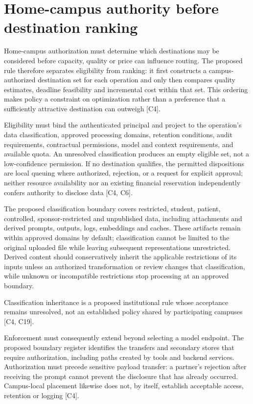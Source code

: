 \documentclass[11pt]{article}
\begin{document}
\section{Home-campus authority before destination ranking}
Home-campus authorization must determine which destinations may be considered before capacity, quality or price can influence routing. The proposed rule therefore separates eligibility from ranking: it first constructs a campus-authorized destination set for each operation and only then compares quality estimates, deadline feasibility and incremental cost within that set. This ordering makes policy a constraint on optimization rather than a preference that a sufficiently attractive destination can outweigh [C4].

Eligibility must bind the authenticated principal and project to the operation\textquoteright{}s data classification, approved processing domains, retention conditions, audit requirements, contractual permissions, model and context requirements, and available quota. An unresolved classification produces an empty eligible set, not a low-confidence permission. If no destination qualifies, the permitted dispositions are local queuing where authorized, rejection, or a request for explicit approval; neither resource availability nor an existing financial reservation independently confers authority to disclose data [C4, C6].

The proposed classification boundary covers restricted, student, patient, controlled, sponsor-restricted and unpublished data, including attachments and derived prompts, outputs, logs, embeddings and caches. These artifacts remain within approved domains by default; classification cannot be limited to the original uploaded file while leaving subsequent representations unrestricted. Derived content should conservatively inherit the applicable restrictions of its inputs unless an authorized transformation or review changes that classification, while unknown or incompatible restrictions stop processing at an approved boundary.

Classification inheritance is a proposed institutional rule whose acceptance remains unresolved, not an established policy shared by participating campuses [C4, C19].

Enforcement must consequently extend beyond selecting a model endpoint. The proposed boundary register identifies the transfers and secondary stores that require authorization, including paths created by tools and backend services. Authorization must precede sensitive payload transfer: a partner\textquoteright{}s rejection after receiving the prompt cannot prevent the disclosure that has already occurred. Campus-local placement likewise does not, by itself, establish acceptable access, retention or logging [C4].
\end{document}
